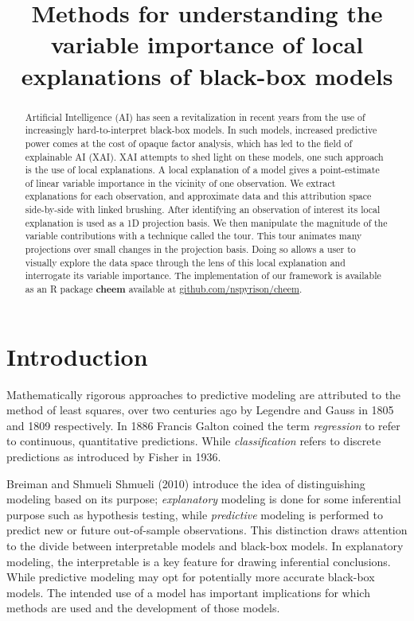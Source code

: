 \documentclass[
]{article}
\title{Methods for understanding the variable importance of local explanations of black-box models}
\author{}
\date{\vspace{-2.5em}}
\begin{document}
\maketitle
\begin{abstract}
Artificial Intelligence (AI) has seen a revitalization in recent years from the use of increasingly hard-to-interpret black-box models. In such models, increased predictive power comes at the cost of opaque factor analysis, which has led to the field of explainable AI (XAI). XAI attempts to shed light on these models, one such approach is the use of local explanations. A local explanation of a model gives a point-estimate of linear variable importance in the vicinity of one observation. We extract explanations for each observation, and approximate data and this attribution space side-by-side with linked brushing. After identifying an observation of interest its local explanation is used as a 1D projection basis. We then manipulate the magnitude of the variable contributions with a technique called the tour. This tour animates many projections over small changes in the projection basis. Doing so allows a user to visually explore the data space through the lens of this local explanation and interrogate its variable importance. The implementation of our framework is available as an R package \textbf{cheem} available at \href{https://github.com/nspyrison/cheem}{github.com/nspyrison/cheem}.
\end{abstract}

\hypertarget{sec:intro}{%
\section{Introduction}\label{sec:intro}}

Mathematically rigorous approaches to predictive modeling are attributed to the method of least squares, over two centuries ago by Legendre and Gauss in 1805 and 1809 respectively. In 1886 Francis Galton coined the term \emph{regression} to refer to continuous, quantitative predictions. While \emph{classification} refers to discrete predictions as introduced by Fisher in 1936.

Breiman and Shmueli Shmueli (2010) introduce the idea of distinguishing modeling based on its purpose; \emph{explanatory} modeling is done for some inferential purpose such as hypothesis testing, while \emph{predictive} modeling is performed to predict new or future out-of-sample observations. This distinction draws attention to the divide between interpretable models and black-box models. In explanatory modeling, the interpretable is a key feature for drawing inferential conclusions. While predictive modeling may opt for potentially more accurate black-box models. The intended use of a model has important implications for which methods are used and the development of those models.
\end{document}
